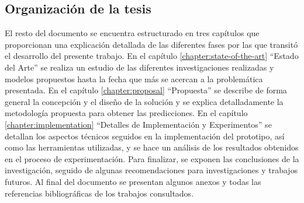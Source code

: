 \subsection*{Organización de la tesis}

El resto del documento se encuentra estructurado en tres capítulos que proporcionan una explicación detallada de las diferentes fases por las que transitó el desarrollo del presente trabajo. En el capítulo \ref{chapter:state-of-the-art} ``Estado del Arte'' se realiza un estudio de las diferentes investigaciones realizadas y modelos propuestos hasta la fecha que más se acercan a la problemática presentada. En el capítulo \ref{chapter:proposal} ``Propuesta'' se describe de forma general la concepción y el diseño de la solución y se explica detalladamente la metodología propuesta para obtener las predicciones. En el capítulo \ref{chapter:implementation} ``Detalles de Implementación y Experimentos'' se detallan los aspectos técnicos seguidos en la implementación del prototipo, así como las herramientas utilizadas, y se hace un análisis de los resultados obtenidos en el proceso de experimentación. Para finalizar, se exponen las conclusiones de la investigación, seguido de algunas recomendaciones para investigaciones y trabajos futuros. Al final del documento se presentan algunos anexos y todas las referencias bibliográficas de los trabajos consultados.